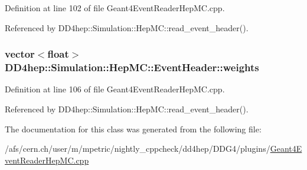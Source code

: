 Definition at line 102 of file Geant4EventReaderHepMC.cpp.

Referenced by DD4hep::Simulation::HepMC::read\_\-event\_\-header().\hypertarget{class_d_d4hep_1_1_simulation_1_1_hep_m_c_1_1_event_header_a21a1d471bc6ce75aedfdb9be2db5b0b2}{
\subsubsection[{weights}]{\setlength{\rightskip}{0pt plus 5cm}vector$<$float$>$ {\bf DD4hep::Simulation::HepMC::EventHeader::weights}}}
\label{class_d_d4hep_1_1_simulation_1_1_hep_m_c_1_1_event_header_a21a1d471bc6ce75aedfdb9be2db5b0b2}


Definition at line 106 of file Geant4EventReaderHepMC.cpp.

Referenced by DD4hep::Simulation::HepMC::read\_\-event\_\-header().

The documentation for this class was generated from the following file:\begin{DoxyCompactItemize}
\item 
/afs/cern.ch/user/m/mpetric/nightly\_\-cppcheck/dd4hep/DDG4/plugins/\hyperlink{_geant4_event_reader_hep_m_c_8cpp}{Geant4EventReaderHepMC.cpp}\end{DoxyCompactItemize}
